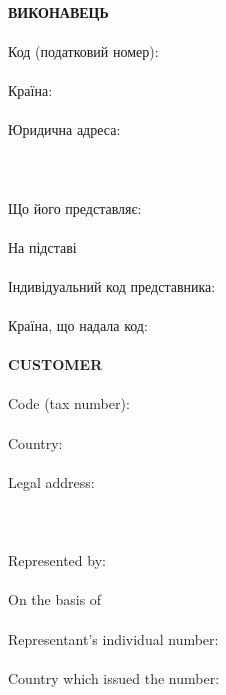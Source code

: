 \begin{Form}
\begin{paracol}{3}
{        \\
        \textbf{ВИКОНАВЕЦЬ}\\
        \\
        Код (податковий номер):\\
        \\
        Країна:\\
        \\
        Юридична адреса:\\
        \\
        \\
        \\
        Що його представляє:\\
        \\
        На підставі\\
        \\
        Індивідуальний код представника:\\
        \\
        Країна, що надала код:\\
        \\
        }
        {\textbf{CUSTOMER}\\
        \\
        Code (tax number):\\
        \\
        Country:\\
        \\
        Legal address:\\
        \\
        \\
        \\
        Represented by:\\
        \\
        On the basis of\\
        \\
        Representant's individual number:\\
        \\
        Country which issued the number:\\
}
\end{paracol}
\end{Form}
